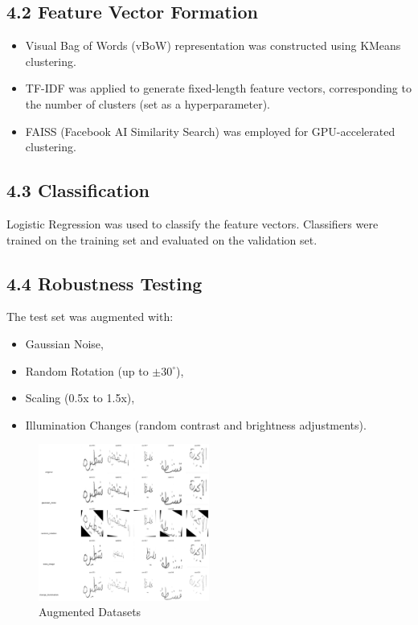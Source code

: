 \documentclass[12pt]{article}
\begin{document}
\subsection*{4.2 Feature Vector Formation}
\begin{itemize}
    \item Visual Bag of Words (vBoW) representation was constructed using KMeans clustering.
    \item TF-IDF was applied to generate fixed-length feature vectors, corresponding to the number of clusters (set as a hyperparameter).
    \item FAISS (Facebook AI Similarity Search) was employed for GPU-accelerated clustering.
\end{itemize}

\subsection*{4.3 Classification}
Logistic Regression was used to classify the feature vectors. Classifiers were trained on the training set and evaluated on the validation set.

\subsection*{4.4 Robustness Testing}
The test set was augmented with:
\begin{itemize}
    \item Gaussian Noise,
    \item Random Rotation (up to $\pm 30^\circ$),
    \item Scaling (0.5x to 1.5x),
    \item Illumination Changes (random contrast and brightness adjustments).
\end{itemize}

\begin{figure}[h!]
    \centering
    \includegraphics[width=0.5\textwidth]{figures/augmented.png} %
    \caption{Augmented Datasets}
    \label{fig:robustness_chart}
\end{figure}
\end{document}
